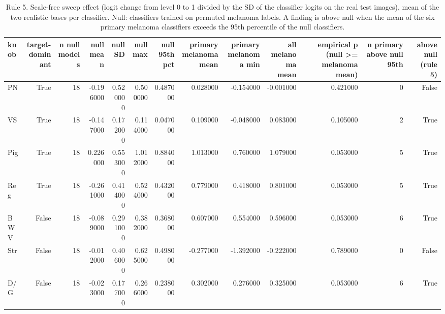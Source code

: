 \begin{table}
\caption{Rule 5. Scale-free sweep effect (logit change from level 0 to 1 divided by the SD of the classifier logits on the real test images), mean of the two realistic bases per classifier. Null: classifiers trained on permuted melanoma labels. A finding is above null when the mean of the six primary melanoma classifiers exceeds the 95th percentile of the null classifiers.}
\label{tab:T3_null_distribution}
\begin{tabular}{lrrrrrrrrrrrr}
\toprule
knob & target-dominant & n null models & null mean & null SD & null max & null 95th pct & primary melanoma mean & primary melanoma min & all melanoma mean & empirical p (null >= melanoma mean) & n primary above null 95th & above null (rule 5) \\
\midrule
PN & True & 18 & -0.196000 & 0.520000 & 0.500000 & 0.487000 & 0.028000 & -0.154000 & -0.001000 & 0.421000 & 0 & False \\
VS & True & 18 & -0.147000 & 0.172000 & 0.114000 & 0.047000 & 0.109000 & -0.048000 & 0.083000 & 0.105000 & 2 & True \\
Pig & True & 18 & 0.226000 & 0.553000 & 1.012000 & 0.884000 & 1.013000 & 0.760000 & 1.079000 & 0.053000 & 5 & True \\
Reg & True & 18 & -0.261000 & 0.414000 & 0.524000 & 0.432000 & 0.779000 & 0.418000 & 0.801000 & 0.053000 & 5 & True \\
BWV & False & 18 & -0.089000 & 0.291000 & 0.382000 & 0.368000 & 0.607000 & 0.554000 & 0.596000 & 0.053000 & 6 & True \\
Str & False & 18 & -0.012000 & 0.406000 & 0.625000 & 0.498000 & -0.277000 & -1.392000 & -0.222000 & 0.789000 & 0 & False \\
D/G & False & 18 & -0.023000 & 0.177000 & 0.266000 & 0.238000 & 0.302000 & 0.276000 & 0.325000 & 0.053000 & 6 & True \\
\bottomrule
\end{tabular}
\end{table}
